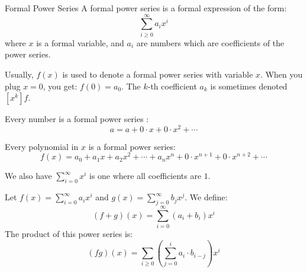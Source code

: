 \documentclass{report}
\begin{document}
\begin{definition}{Formal Power Series}
    A formal power series is a formal expression of the form:
        \begin{equation*}
            \sum_{i \geq 0}^{\infty} a_{i}x^{i}
        \end{equation*}
    where $x$ is a formal variable, and $a_{i}$ are numbers which are coefficients of the power series.
\end{definition}

Usually, $f(x)$ is used to denote a formal power series with variable $x$. When you plug $x = 0$, you get: $f(0) = a_{0}$. The $k$-th coefficient $a_{k}$ is sometimes denoted $[x^{k}]f$.

\begin{examples}
    \begin{example}
        Every number is a formal power series :
            \begin{equation*}
                a = a + 0 \cdot x + 0 \cdot x^{2} + \cdots 
            \end{equation*}
    \end{example}
    \begin{example}
        Every polynomial in $x$ is a formal power series:
            \begin{equation*}
                f(x) = a_{0} + a_{1}x + a_{2}x^{2} + \cdots +a_{n}x^{n} + 0 \cdot x^{n + 1} + 0 \cdot x^{n + 2} + \cdots 
            \end{equation*}
    \end{example}
    \begin{example}
        We also have $\sum_{i = 0}^{\infty} x^{i}$ is one where all coefficients are $1$.
    \end{example}
\end{examples}

Let $f(x) = \sum_{i = 0}^{\infty} a_{i}x^{i}$  and $g(x) = \sum_{j = 0}^{\infty} b_{j}x^{j}$. We define:
    \begin{equation*}
        (f + g)(x) = \sum_{i = 0}^{\infty} (a_{i} + b_{i})x^{i}
    \end{equation*}
The product of this power series is:
    \begin{equation*}
        (fg)(x) = \sum_{i \geq 0}^{} \left(\sum_{j = 0}^{i} a_{i} \cdot b_{i - j}\right)x^{i}
    \end{equation*}
\end{document}

